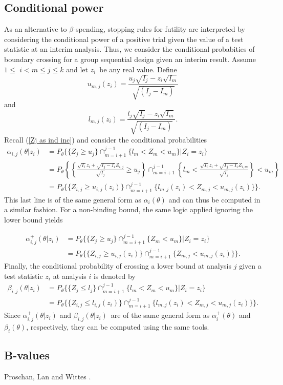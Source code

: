 \subsection{Conditional power\label{sec:CP}}

\bigskip
As an alternative to $\beta$-spending, stopping
rules for futility are interpreted by considering the conditional power of a
positive trial given the value of a test statistic at an interim analysis.
Thus, we consider the conditional probabities of boundary crossing for a group
sequential design given an interim result. Assume $1\leq$ $i<m\leq j\leq k$
and let $z_{i}$\ be any real value. Define%
\begin{equation}
u_{m,j}(z_{i})=\frac{u_{j}\sqrt{I_{j}}-z_{i}\sqrt{I_{m}}}{\sqrt{(I_{j}-I_{m}%
)}}\label{umj}%
\end{equation}
and
\begin{equation}
l_{m,j}(z_{i})=\frac{l_{j}\sqrt{I_{j}}-z_{i}\sqrt{I_{m}}}{\sqrt{(I_{j}-I_{m}%
)}}.\label{lmj}%
\end{equation}
Recall (\ref{Zj as ind inc}) and consider the conditional probabilities%
\begin{align}
\alpha_{i,j}(\theta|z_{i})  & =P_{\theta}\{\{Z_{j}\geqslant u_{j}%
\}\cap_{m=i+1}^{j-1}\{l_{m}<Z_{m}<u_{m}\}|Z_{i}=z_{i}%
\}\label{Cond lower bound prob}\\
& =P_{\theta}\left\{  \left\{  \frac{\sqrt{I_{i}}z_{i}+\sqrt{I_{j}-I_{i}%
}Z_{i,j}}{\sqrt{I_{j}}}\geqslant u_{j}\right\}  \cap_{m=i+1}^{j-1}\left\{
l_{m}<\frac{\sqrt{I_{i}}z_{i}+\sqrt{I_{j}-I_{i}}Z_{i,m}}{\sqrt{I_{j}}%
}\right\}  <u_{m}\right\} \nonumber\\
& =P_{\theta}\{\{Z_{i,j}\geqslant u_{i,j}(z_{i})\}\cap_{m=i+1}^{j-1}%
\{l_{m,j}(z_{i})<Z_{m,j}<u_{m,j}(z_{i})\}\}.\nonumber
\end{align}
This last line is of the same general form as $\alpha_{i}(\theta)$ and can
thus be computed in a similar fashion. For a non-binding bound, the same logic
applied ignoring the lower bound yields%

\begin{align}
\alpha_{i,j}^{+}(\theta|z_{i})  & =P_{\theta}\{\{Z_{j}\geqslant u_{j}%
\}\cap_{m=i+1}^{j-1}\{Z_{m}<u_{m}\}|Z_{i}=z_{i}\}\label{alphaij+}\\
& =P_{\theta}\{\{Z_{i,j}\geqslant u_{i,j}(z_{i})\}\cap_{m=i+1}^{j-1}%
\{Z_{m,j}<u_{m,j}(z_{i})\}\}.\nonumber
\end{align}
Finally, the conditional probability of crossing a lower bound at analysis $j$ given a test statistic $z_{i}$ at analysis $i$ is denoted by
\begin{align}
\beta_{i,j}(\theta|z_{i})  & =P_{\theta}\{\{Z_{j}\leq l_{j}\}\cap
_{m=i+1}^{j-1}\{l_{m}<Z_{m}<u_{m}\}|Z_{i}=z_{i}\}\label{Conditional power}\\
& =P_{\theta}\{\{Z_{i,j}\leq l_{i,j}(z_{i})\}\cap_{m=i+1}^{j-1}\{l_{m,j}
(z_{i})<Z_{m,j}<u_{m,j}(z_{i})\}\}.\nonumber
\end{align}
Since $\alpha_{i,j}^{+}(\theta|z_{i})$ and $\beta_{i,j}(\theta|z_{i})$\ are of
the same general form as $\alpha_{i}^{+}(\theta)$ and $\beta_{i}(\theta)$,
respectively, they can be computed using the same tools.

\subsection{B-values}
Proschan, Lan and Wittes \cite{PLWBook}.
